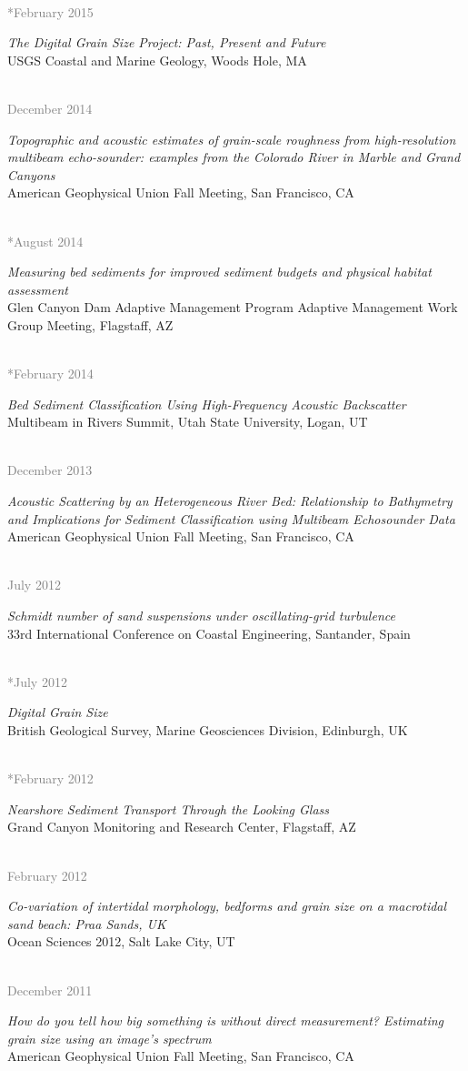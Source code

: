 \documentclass{article} %
\newlength\sidebarwidth
\newcommand{\dateonly}[2][]
	 {\begin{minipage}{\textwidth}
	 \vspace*{.4\baselineskip}
         \nopagebreak\hspace{0in}%
         \nopagebreak\begin{minipage}[t]{\sidebarwidth - .2cm}
         \raggedleft {~}
         {\\[-\baselineskip] \textcolor{gray}{\footnotesize #1}}
	 \end{minipage}%
	 \hfill
	 \begin{minipage}[t]{\linewidth - \sidebarwidth}
	 #2%
	 \end{minipage}%
	 \vspace*{.2\baselineskip plus 1\baselineskip minus
	 .2\baselineskip}%
	 \end{minipage}}
\begin{document}
  \dateonly[**February 2015]{
      {\it The Digital Grain Size Project: Past, Present and Future}\\
      USGS Coastal and Marine Geology, Woods Hole, MA
  }

  \dateonly[December 2014]{
      {\it Topographic and acoustic estimates of grain-scale roughness from high-resolution multibeam echo-sounder: examples from the Colorado River in Marble and Grand Canyons}\\
      American Geophysical Union Fall Meeting, San Francisco, CA
  }

  \dateonly[**August 2014]{
      {\it Measuring bed sediments for improved sediment budgets and physical habitat assessment}\\
      Glen Canyon Dam Adaptive Management Program Adaptive Management Work Group Meeting, Flagstaff, AZ
  }

  \dateonly[**February 2014]{
      {\it Bed Sediment Classification Using High-Frequency Acoustic Backscatter}\\
      Multibeam in Rivers Summit, Utah State University, Logan, UT
  }

  \dateonly[December 2013]{
      {\it Acoustic Scattering by an Heterogeneous River Bed: Relationship to Bathymetry and Implications for Sediment Classification using Multibeam Echosounder Data}\\
      American Geophysical Union Fall Meeting, San Francisco, CA
  }

  \dateonly[July 2012]{
      {\it Schmidt number of sand suspensions under oscillating-grid turbulence}\\
      33rd International Conference on Coastal Engineering, Santander, Spain
  }

  \dateonly[**July 2012]{
      {\it Digital Grain Size}\\
      British Geological Survey, Marine Geosciences Division, Edinburgh, UK
  }

  \dateonly[**February 2012]{
      {\it Nearshore Sediment Transport Through the Looking Glass}\\
      Grand Canyon Monitoring and Research Center, Flagstaff, AZ
  }

  \dateonly[February 2012]{
      {\it Co-variation of intertidal morphology, bedforms and grain size on a macrotidal sand beach: Praa Sands, UK}\\
      Ocean Sciences 2012, Salt Lake City, UT
  }

  \dateonly[December 2011]{
      {\it How do you tell how big something is without direct measurement? Estimating grain size using an image's spectrum}\\
      American Geophysical Union Fall Meeting, San Francisco, CA
  }
\end{document}
